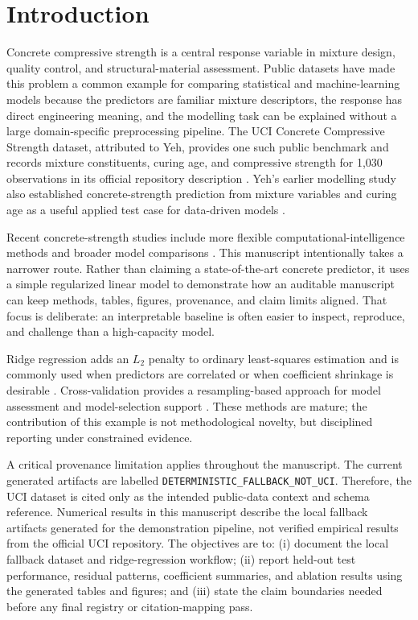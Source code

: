 \section{Introduction}
\label{sec:introduction}

Concrete compressive strength is a central response variable in mixture design, quality control, and structural-material assessment. Public datasets have made this problem a common example for comparing statistical and machine-learning models because the predictors are familiar mixture descriptors, the response has direct engineering meaning, and the modelling task can be explained without a large domain-specific preprocessing pipeline. The UCI Concrete Compressive Strength dataset, attributed to Yeh, provides one such public benchmark and records mixture constituents, curing age, and compressive strength for 1,030 observations in its official repository description \citep{Yeh1998_UCIConcreteDataset}. Yeh's earlier modelling study also established concrete-strength prediction from mixture variables and curing age as a useful applied test case for data-driven models \citep{Yeh1998_ConcreteANN}.

Recent concrete-strength studies include more flexible computational-intelligence methods and broader model comparisons \citep{NunezMaraniFlahNehdi2021_ConcreteMLReview}. This manuscript intentionally takes a narrower route. Rather than claiming a state-of-the-art concrete predictor, it uses a simple regularized linear model to demonstrate how an auditable manuscript can keep methods, tables, figures, provenance, and claim limits aligned. That focus is deliberate: an interpretable baseline is often easier to inspect, reproduce, and challenge than a high-capacity model.

Ridge regression adds an \(L_2\) penalty to ordinary least-squares estimation and is commonly used when predictors are correlated or when coefficient shrinkage is desirable \citep{HoerlKennard1970_Ridge}. Cross-validation provides a resampling-based approach for model assessment and model-selection support \citep{Stone1974_CrossValidation}. These methods are mature; the contribution of this example is not methodological novelty, but disciplined reporting under constrained evidence.

A critical provenance limitation applies throughout the manuscript. The current generated artifacts are labelled \texttt{DETERMINISTIC\_FALLBACK\_NOT\_UCI}. Therefore, the UCI dataset is cited only as the intended public-data context and schema reference. Numerical results in this manuscript describe the local fallback artifacts generated for the demonstration pipeline, not verified empirical results from the official UCI repository. The objectives are to: (i) document the local fallback dataset and ridge-regression workflow; (ii) report held-out test performance, residual patterns, coefficient summaries, and ablation results using the generated tables and figures; and (iii) state the claim boundaries needed before any final registry or citation-mapping pass.
